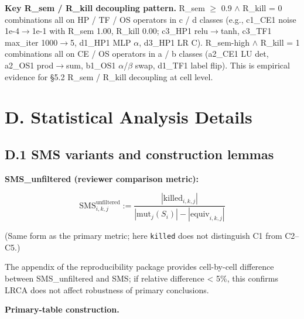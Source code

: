 \documentclass[manuscript,screen,review]{acmart}
\begin{document}
\textbf{Key R\_sem / R\_kill decoupling pattern.} R\_sem $\geq$ 0.9 $\wedge$ R\_kill
= 0 combinations all on HP / TF / OS operators in c / d classes (e.g.,
c1\_CE1 noise 1e-4$\to$1e-1 with R\_sem 1.00, R\_kill 0.00; c3\_HP1
relu$\to$tanh, c3\_TF1 max\_iter 1000$\to$5, d1\_HP1 MLP $\alpha$, d3\_HP1 LR C).
R\_sem-high $\wedge$ R\_kill = 1 combinations all on CE / OS operators in a / b
classes (a2\_CE1 LU det, a2\_OS1 prod$\to$sum, b1\_OS1 $\alpha$/$\beta$ swap, d1\_TF1
label flip). This is empirical evidence for §5.2 R\_sem / R\_kill
decoupling at cell level.


\section{D. Statistical Analysis Details}\label{d.-statistical-analysis-details}

\subsection{D.1 SMS variants and construction lemmas}\label{d.1-sms-variants-and-construction-lemmas}

\textbf{SMS\_unfiltered (reviewer comparison metric):}

\[
\mathrm{SMS}^{\mathrm{unfiltered}}_{i,k,j} := \frac{|\mathrm{killed}_{i,k,j}|}{|\mathrm{mut}_j(S_i)| - |\mathrm{equiv}_{i,k,j}|}
\]

(Same form as the primary metric; here \texttt{killed} does not distinguish C1 from C2--C5.)

The appendix of the reproducibility package provides cell-by-cell
difference between SMS\_unfiltered and SMS; if relative difference
\textless{} 5\%, this confirms LRCA does not affect robustness of
primary conclusions.

\textbf{Primary-table construction.}
\end{document}

